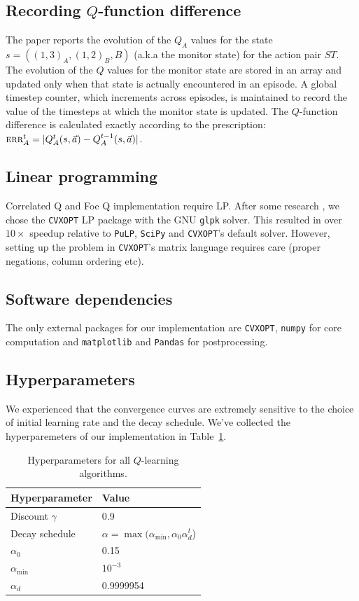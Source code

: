 \documentclass[conference]{IEEEtran}
\begin{document}
\subsection{Recording $Q$-function difference}
The paper reports the evolution of the $Q_A$ values for the state $s = ((1, 3)_A,(1,2)_B, B)$ (a.k.a the monitor state) for the action pair $ST$. The evolution of the $Q$ values for the monitor state are stored in an array and updated only when that state is actually encountered in an episode. A global timestep counter, which increments across episodes, is maintained to record the value of the timesteps at which the monitor state is updated. The $Q$-function difference is calculated exactly according to the prescription: $\textsc{err}_A^t = \vert Q_A^t(s, \vec{a}) - Q_A^{t-1}(s, \vec{a})\vert$.
\subsection{Linear programming}
Correlated Q and Foe Q implementation require LP. After some research \cite{cvxopt}, we chose the {\tt CVXOPT} LP package with the GNU {\tt glpk} solver. This resulted in over $10\times$ speedup relative to {\tt PuLP}, {\tt SciPy} and {\tt CVXOPT}'s default solver. However, setting up the problem in {\tt CVXOPT}'s matrix language requires care (proper negations, column ordering etc).
\subsection{Software dependencies}
The only external packages for our implementation are {\tt CVXOPT}, {\tt numpy} for core computation and {\tt matplotlib} and {\tt Pandas} for postprocessing.
\subsection{Hyperparameters}
We experienced that the convergence curves are {extremely sensitive} to the choice of initial learning rate and the decay schedule. We've collected the hyperparemeters of our implementation in Table~\ref{tab:hyper}.
\begin{table}[!h]
\begin{center}
\begin{tabular}{|l|l|}
\hline
Hyperparameter & Value\\ \hline 
Discount $\gamma$ & 0.9\\
Decay schedule & $\alpha = \max(\alpha_{\text{min}}, \alpha_0\alpha_d^t$) \\
$\alpha_0$ & 0.15 \\
$\alpha_{\text{min}}$ & $10^{-3}$ \\ 
$\alpha_d$ & 0.9999954 \\ \hline
\end{tabular}
\end{center}
\caption{Hyperparameters for all $Q$-learning algorithms. \label{tab:hyper}}
\end{table}
\end{document}
